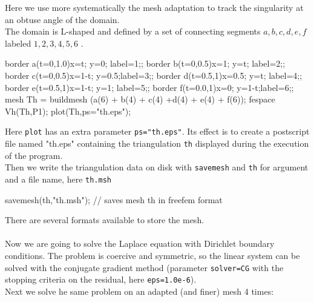 \documentclass[twoside]{book}
\newif\ifpdf
\begin{document}
\graphicspath{{./}{plots/}}
\ifpdf
\DeclareGraphicsExtensions{.pdf, .jpg, .tif}
\else
{}
\fi

\let\subsubsection\subsection
\let\subsection\section
\let\section\chapter

Here we use more systematically the mesh adaptation to track the
singularity at an obtuse angle of the domain.
\\
The domain is L-shaped and defined by a set of connecting segments
$a,b,c,d,e,f$ labeled $1,2,3,4,5,6$ .
\bFF

border a(t=0,1.0){x=t;   y=0;  label=1;};
border b(t=0,0.5){x=1;   y=t;  label=2;};
border c(t=0,0.5){x=1-t; y=0.5;label=3;};
border d(t=0.5,1){x=0.5; y=t;  label=4;};
border e(t=0.5,1){x=1-t; y=1;  label=5;};
border f(t=0.0,1){x=0;   y=1-t;label=6;};
mesh Th = buildmesh (a(6) + b(4) + c(4) +d(4) + e(4) + f(6));
fespace Vh(Th,P1);
plot(Th,ps="th.eps");
\eFF

Here \texttt{plot} has an extra parameter \texttt{ps="th.eps"}.  Its effect
is to create a postscript file named "th.eps" containing the triangulation \texttt{th}
displayed during the execution of the program.
\\
Then we write the triangulation data on disk with
\texttt{savemesh} and
\texttt{th} for argument and a file name, here \texttt{th.msh}
\bFF

savemesh(th,"th.msh");  // saves mesh th in freefem format
\eFF

There are several formats available to store the mesh.
\\\\
Now we are going to solve the Laplace equation with 
Dirichlet boundary conditions. The problem is coercive and symmetric,
so the linear system can be solved with the conjugate gradient
method  (parameter \texttt{solver=CG}
with the stopping criteria on the residual, here
\texttt{eps=1.0e-6}).
\\ Next we solve  he same problem on an adapted (and finer) mesh 4 times:
\end{document}
